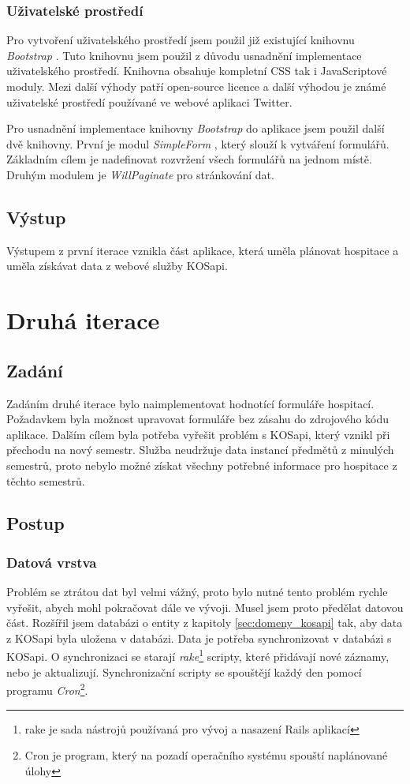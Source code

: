 \subsubsection{Uživatelské prostředí}
Pro vytvoření uživatelského prostředí jsem použil již existující knihovnu \textit{Bootstrap} \cite{bootstrap}. Tuto knihovnu jsem použil z důvodu usnadnění implementace uživatelského prostředí. Knihovna obsahuje kompletní CSS tak i JavaScriptové moduly. Mezi další výhody patří open-source licence a další výhodou je známé uživatelské prostředí používané ve webové aplikaci Twitter.

Pro usnadnění implementace knihovny \textit{Bootstrap} do aplikace jsem použil další dvě knihovny. První je modul \textit{SimpleForm} \cite{simpleform}, který slouží k vytváření formulářů. Základním cílem je nadefinovat rozvržení všech formulářů na jednom místě. Druhým modulem je \textit{WillPaginate} \cite{willpaginate} pro stránkování dat.

\subsection{Výstup} 
Výstupem z první iterace vznikla část aplikace, která uměla plánovat hospitace a uměla získávat data z webové služby KOSapi.


\section{Druhá iterace}
\subsection{Zadání}
Zadáním druhé iterace bylo naimplementovat hodnotící formuláře hospitací. Požadavkem byla možnost upravovat formuláře bez zásahu do zdrojového kódu aplikace. Dalším cílem byla potřeba vyřešit problém s KOSapi, který vznikl při přechodu na nový semestr. Služba neudržuje data instancí předmětů z minulých semestrů, proto nebylo možné získat všechny potřebné informace pro hospitace z těchto semestrů.

\subsection{Postup}
\subsubsection{Datová vrstva}
Problém se ztrátou dat byl velmi vážný, proto bylo nutné tento problém rychle vyřešit, abych mohl pokračovat dále ve vývoji. Musel jsem proto předělat datovou část. Rozšířil jsem databázi o entity z kapitoly \ref{sec:domeny_kosapi} tak, aby data z KOSapi byla uložena v databázi. Data je potřeba synchronizovat v databázi s KOSapi. O synchronizaci se starají \textit{rake}\footnote{rake je sada nástrojů používaná pro vývoj a nasazení Rails aplikací} scripty, které přidávají nové záznamy, nebo je
aktualizují. Synchronizační scripty se spouštějí každý den pomocí programu \textit{Cron}\footnote{Cron je program, který na pozadí operačního systému spouští naplánované úlohy}.

